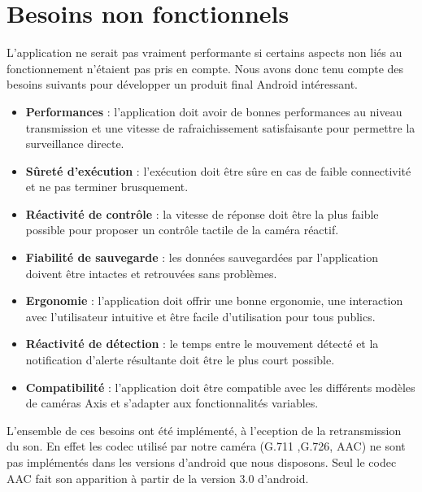 \section{Besoins non fonctionnels}
L'application ne serait pas vraiment performante si certains aspects non liés au fonctionnement n'étaient pas pris en compte. Nous avons donc tenu compte des besoins suivants pour développer un produit final Android intéressant.
\begin{itemize}
  \item \textbf{Performances} : l'application doit avoir de bonnes performances au
  niveau transmission et une vitesse de rafraichissement satisfaisante pour permettre la surveillance directe.
  \item \textbf{Sûreté d'exécution} : l'exécution doit être sûre en cas de faible
  connectivité et ne pas terminer brusquement.
  \item \textbf{Réactivité de contrôle} : la vitesse de réponse doit être la plus
  faible possible pour proposer un contrôle tactile de la caméra réactif.
  \item \textbf{Fiabilité de sauvegarde} : les données sauvegardées par
  l'application doivent être intactes et retrouvées sans problèmes.
  \item \textbf{Ergonomie} : l'application doit offrir une bonne ergonomie, une
  interaction avec l'utilisateur intuitive et être facile d'utilisation pour tous publics.
  \item \textbf{Réactivité de détection} : le temps entre le mouvement détecté et
  la notification d'alerte résultante doit être le plus court possible.
  \item \textbf{Compatibilité} : l'application doit être compatible avec les
  différents modèles de caméras Axis et s'adapter aux fonctionnalités variables.
\end{itemize}
L'ensemble de ces besoins ont été implémenté, à l'eception de la retransmission
du son. En effet les codec utilisé par notre caméra (G.711 ,G.726, AAC) ne sont
pas implémentés dans les versions d'android que nous disposons. Seul le codec AAC fait son
apparition à partir de la version 3.0 d'android.
\clearpage